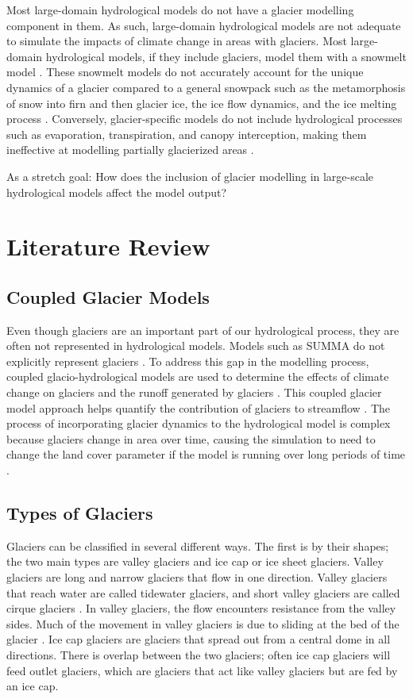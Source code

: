 \documentclass{article}
\begin{document}
Most large-domain hydrological models do not have a glacier modelling component in them. As such, large-domain hydrological models are not adequate to simulate the impacts of climate change in areas with glaciers. Most large-domain hydrological models, if they include glaciers, model them with a snowmelt model \citep{Pradhananga2020, Naz2014}. These snowmelt models do not accurately account for the unique dynamics of a glacier compared to a general snowpack such as the metamorphosis of snow into firn and then glacier ice, the ice flow dynamics, and the ice melting process \citep{Pradhananga2020}. Conversely, glacier-specific models do not include hydrological processes such as evaporation, transpiration, and canopy interception, making them ineffective at modelling partially glacierized areas \citep{Clarke2015, Maussion2019, Rounce2020}. 

As a stretch goal: How does the inclusion of glacier modelling in large-scale hydrological models affect the model output?



\section{Literature Review}

\subsection{Coupled Glacier Models} 
Even though glaciers are an important part of our hydrological process, they are often not represented in hydrological models. Models such as SUMMA do not explicitly represent glaciers \citep{Clark2015}. To address this gap in the modelling process, coupled glacio-hydrological models are used to determine the effects of climate change on glaciers and the runoff generated by glaciers \citep{Jost2012, Naz2014}. This coupled glacier model approach helps quantify the contribution of glaciers to streamflow \citep{Jost2012}. The process of incorporating glacier dynamics to the hydrological model is complex because glaciers change in area over time, causing the simulation to need to change the land cover parameter if the model is running over long periods of time \citep{Jost2012}. 

\subsection{Types of Glaciers}
Glaciers can be classified in several different ways. The first is by their shapes; the two main types are valley glaciers and ice cap or ice sheet glaciers. Valley glaciers are long and narrow glaciers that flow in one direction. Valley glaciers that reach water are called tidewater glaciers, and short valley glaciers are called cirque glaciers \citep{Hooke2013}. In valley glaciers, the flow encounters resistance from the valley sides. Much of the movement in valley glaciers is due to sliding at the bed of the glacier \citep{Nye1952}. Ice cap glaciers are glaciers that spread out from a central dome in all directions. There is overlap between the two glaciers; often ice cap glaciers will feed outlet glaciers, which are glaciers that act like valley glaciers but are fed by an ice cap.
\end{document}

